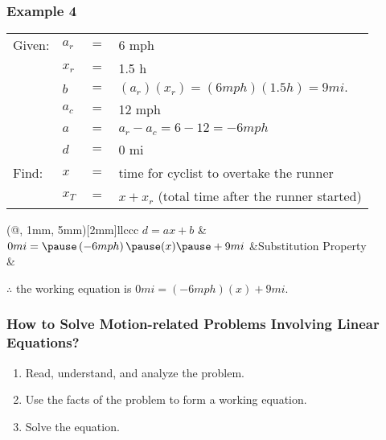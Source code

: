 \documentclass[14pt]{beamer}
\begin{document}
    \begin{frame}
    	\frametitle{Example 4}
    	\begin{tabular}{llll}
    		Given: &  $ a_r $ & $ = $ & 6 mph \\
    		&  $ x_r $ & $ = $ & 1.5 h \\
    		&  $ b $ & $ = $ & $ (a_r)(x_r) = (6 mph)(1.5 h) = 9 mi. $ \\
    		&  $ a_c $ & $ = $ & 12 mph \\
    		&  $ a $ & $ = $ & $ a_r - a_c = 6 - 12 = -6 mph $\\
    		&  $ d $ & $ = $ & 0 mi \\
    		 Find: & $ x $ & $ = $ & \small time for cyclist to overtake the runner \normalsize \\  
    		 & $ x_T $ & $ = $ & $ x + x_r $ \footnotesize (total time after the runner started)  \\  
    	\end{tabular}
    	
    	\begin{TAB}(@, 1mm, 5mm)[2mm]{ll}{ccc}
    		\pause $ d = ax + b $ &  \\
    		
    		\pause $ 0 mi = \pause \left(-6 mph\right)\pause (x) \pause + 9 mi $  &\pause Substitution Property \\
    		& \\
    	\end{TAB}
    	
    	\pause $ \therefore $ the working equation is $ 0 mi = (-6 mph) (x) + 9 mi $.
    \end{frame}  
    
    \begin{frame}
    	\frametitle{How  to Solve Motion-related Problems Involving Linear Equations?}
    	
    	\begin{enumerate}  
    		\item Read, understand, and analyze the problem. 
    		\item Use the facts of the problem to form a working equation.
    		\item Solve the equation.
    	\end{enumerate}  
    \end{frame}
    
\end{document}
